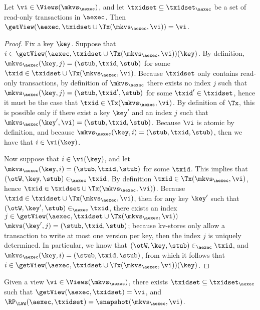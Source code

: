 \begin{proposition}
\label{prop:getview.tx}
Let $\vi \in \Views(\mkvs_{\aexec})$, and let $\txidset \subseteq \txidset_{\aexec}$ be a 
set of read-only transactions in $\aexec$. Then 
$\getView(\aexec, \txidset \cup \Tx(\mkvs_{\aexec}, \vi)) = \vi$. 
\end{proposition}

\begin{proof}
Fix a key $\key$. Suppose that $i \in \getView(\aexec, \txidset \cup \Tx(\mkvs_{\aexec}, \vi))(\key)$. 
By definition, $\mkvs_{\aexec}(\key, j) = (\stub, \txid, \stub)$ for some $\txid \in \txidset \cup \Tx(\mkvs_{\aexec}, \vi)$. 
Because $\txidset$ only contains read-only transactions, by definition of $\mkvs_{\aexec}$ there exists 
no index $j$ such that $\mkvs_{\aexec}(\key, j) = (\stub, \txid', \stub)$ for some $\txid' \in \txidset$, 
hence it must be the case that $\txid \in \Tx(\mkvs_{\aexec}, \vi)$. By definition of $\Tx$, 
this is possible only if there exist a key $\key'$ and an index $j$ such that $\mkvs_{\aexec}(\key', \vi) = (\stub, \txid, \stub)$. 
Because $\vi$ is atomic by definition, and because $\mkvs_{\aexec}(\key, i) = (\stub, \txid, \stub)$, then we have that $i \in \vi(\key)$. 

Now suppose that $i \in \vi(\key)$, and let $\mkvs_{\aexec}(\key, i) = (\stub, \txid, \stub)$ for some $\txid$. 
This implies that $(\otW, \key, \stub) \in_{\aexec} \txid$.
By definition $\txid \in \Tx(\mkvs_{\aexec}, \vi)$, hence $\txid \in \txidset \cup \Tx(\mkvs_{\aexec}, \vi))$. 
Because $\txid \in \txidset \cup \Tx(\mkvs_{\aexec}, \vi)$, then for any key $\key'$ such that 
$(\otW, \key', \stub) \in_{\aexec} \txid$, there exists an index $j \in \getView(\aexec, \txidset \cup \Tx(\mkvs_{\aexec}, \vi))$ 
$\mkvs(\key', j) = (\stub, \txid, \stub)$; because kv-stores only allow a transaction to write at most one version 
per key, then the index $j$ is uniquely determined. In particular, we know that $(\otW, \key, \stub) \in_{\aexec} \txid$, 
and $\mkvs_{\aexec}(\key, i) = (\stub, \txid, \stub)$, from which it follows that $i \in \getView(\aexec, \txidset \cup \Tx(\mkvs_{\aexec}, \vi))(\key)$.
\end{proof}


\begin{proposition}
\label{prop:compatible.kv2aexec}
Given a view $\vi \in \Views(\mkvs_{\aexec})$, there exists $\txidset \subseteq \txidset_{\aexec}$ 
such that $\getView(\aexec, \txidset) = \vi$, and $\RP_{\LWW}(\aexec, \txidset) = \snapshot(\mkvs_{\aexec}, \vi)$.
\end{proposition}

